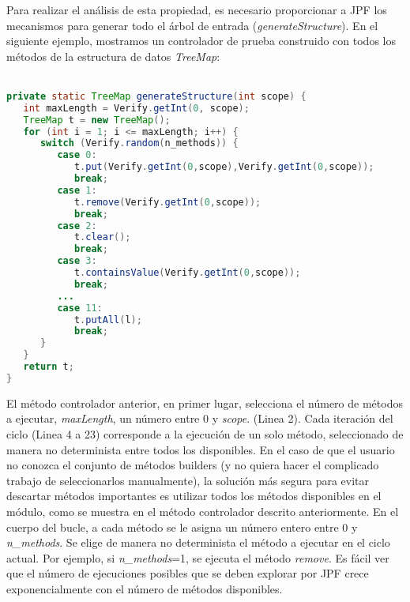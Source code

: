 Para realizar el análisis de esta propiedad, es necesario proporcionar a JPF los mecanismos para generar todo el árbol de entrada (\textit{generateStructure}). 
En el siguiente ejemplo, mostramos un controlador de prueba construido con todos los métodos de la estructura de datos \textit{TreeMap}:
\\
\\
\begin{lstlisting}[caption={Controlador con todos los métodos},label={lst:driverAPI},language=Java,captionpos=b]
private static TreeMap generateStructure(int scope) {
   int maxLength = Verify.getInt(0, scope);
   TreeMap t = new TreeMap();
   for (int i = 1; i <= maxLength; i++) {
      switch (Verify.random(n_methods)) {
         case 0:
            t.put(Verify.getInt(0,scope),Verify.getInt(0,scope));
            break;
         case 1:
            t.remove(Verify.getInt(0,scope));
            break;						
         case 2:
            t.clear();
            break;
         case 3:
            t.containsValue(Verify.getInt(0,scope));
            break;
         ...
         case 11: 
            t.putAll(l);
            break;
      }
   }
   return t;
}
\end{lstlisting}

El método controlador anterior, en primer lugar, selecciona el número de métodos a ejecutar, \textit{maxLength}, un número entre 0 y \textit{scope}. (Linea 2). Cada iteración del ciclo (Linea 4 a 23) corresponde a la ejecución de un solo método, seleccionado de manera no determinista entre todos los disponibles. En el caso de que el usuario no conozca el conjunto de métodos builders (y no quiera hacer el complicado trabajo de seleccionarlos manualmente), la solución más segura para evitar descartar métodos importantes es utilizar todos los métodos disponibles en el módulo, como se muestra en el método controlador descrito anteriormente. En el cuerpo del bucle, a cada método se le asigna un número entero entre 0 y \textit{n\_methods}. Se elige de manera no determinista el método a ejecutar en el ciclo actual. Por ejemplo, si \textit{n\_methods}=1, se ejecuta el método \textit{remove}. Es fácil ver que el número de ejecuciones posibles que se deben explorar por JPF crece exponencialmente con el número de métodos disponibles.


